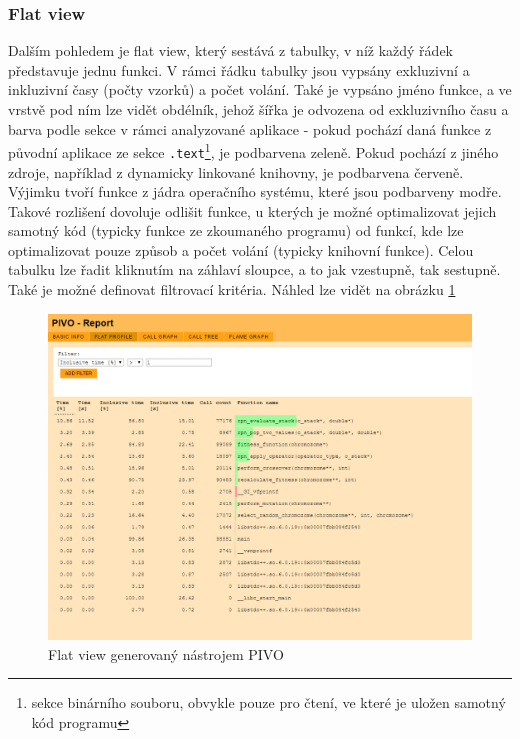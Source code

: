 \documentclass[czech,BP]{thesiskiv}
\begin{document}
\subsubsection*{Flat view}

Dalším pohledem je flat view, který sestává z tabulky, v níž každý řádek představuje jednu funkci. V rámci řádku tabulky jsou vypsány exkluzivní a inkluzivní časy (počty vzorků) a počet volání. Také je vypsáno jméno funkce, a ve vrstvě pod ním lze vidět obdélník, jehož šířka je odvozena od exkluzivního času a barva podle sekce v rámci analyzované aplikace - pokud pochází daná funkce z původní aplikace ze sekce \texttt{.text}\footnote{sekce binárního souboru, obvykle pouze pro čtení, ve které je uložen samotný kód programu}, je podbarvena zeleně. Pokud pochází z jiného zdroje, například z dynamicky linkované knihovny, je podbarvena červeně. Výjimku tvoří funkce z jádra operačního systému, které jsou podbarveny modře. Takové rozlišení dovoluje odlišit funkce, u kterých je možné optimalizovat jejich samotný kód (typicky funkce ze zkoumaného programu) od funkcí, kde lze optimalizovat pouze způsob a počet volání (typicky knihovní funkce). Celou tabulku lze řadit kliknutím na záhlaví sloupce, a to jak vzestupně, tak sestupně. Také je možné definovat filtrovací kritéria. Náhled lze vidět na obrázku \ref{obr:implflat}

\begin{figure}[h]
    \centering
    \includegraphics[interpolate,width=1.0\textwidth]{img/pivo_flat.png}
    \caption{Flat view generovaný nástrojem PIVO}
    \label{obr:implflat}
\end{figure}
\end{document}
